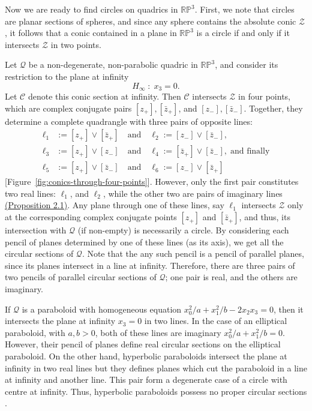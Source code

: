 \documentclass[10pt, a4paper]{article}
\theoremstyle{BoldTopSpacing}
\theoremstyle{BoldTopSpacing}
\theoremstyle{BoldTopSpacing}
\theoremstyle{BoldTopBottomSpacing}
\theoremstyle{BoldTopSpacing}
\theoremstyle{BoldTopBottomSpacing}
\theoremstyle{remark}
\begin{document}
Now we are ready to find circles on quadrics in $\mathbb{R}\mathbb{P}^3$. First, we note that circles are planar sections of spheres, and since any sphere contains the absolute conic $\mathcal{Z}$, it follows that a conic contained in a plane in $\mathbb{R}\mathbb{P}^3$ is a circle if and only if it intersects $\mathcal{Z}$ in two points. \par
Let $\mathcal{Q}$ be a non-degenerate, non-parabolic quadric in $\mathbb{R}\mathbb{P}^3$, and consider its restriction to the plane at infinity
\[
    H_{\infty} \; : \; x_{3} = 0.
\]
Let $\mathcal{C}$ denote this conic section at infinity. Then $\mathcal{C}$ intersects $\mathcal{Z}$ in four points, which are complex conjugate pairs $[z_{+}], [\bar{z}_{+}]$, and $[z_{-}], [\bar{z}_{-}]$. Together, they determine a complete quadrangle with three pairs of opposite lines:
\begin{align*}
    \ell_{1} &:= [z_{+}] \vee [\bar{z}_{+}] \quad \text{and} \quad \ell_{2} := [z_{-}] \vee [\bar{z}_{-}], \\
    \ell_{3} &:= [z_{+}] \vee [z_{-}] \quad \text{and} \quad \ell_{4} := [\bar{z}_{+}] \vee [\bar{z}_{-}], \; \text{and finally} \\
    \ell_{5} &:= [z_{+}] \vee [\bar{z}_{-}] \quad \text{and} \quad \ell_{6} :=  [z_{-}] \vee [\bar{z}_{+}]
\end{align*}
[Figure~\ref{fig:conics-through-four-points}]. However, only the first pair constitutes two real lines: $\ell_{1}$, and $\ell_{2}$, while the other two are pairs of imaginary lines \hyperref[thm:span-real-line]{(Proposition 2.1)}. Any plane through one of these lines, say $\ell_{1}$ intersects $\mathcal{Z}$ only at the corresponding complex conjugate points $[z_{+}]$ and $[\bar{z}_{+}]$, and thus, its intersection with $\mathcal{Q}$ (if non-empty) is necessarily a circle. By considering each pencil of planes determined by one of these lines (as its axis), we get all the circular sections of $\mathcal{Q}$. Note that the any such pencil is a pencil of parallel planes, since its planes intersect in a line at infinity. Therefore, there are three pairs of two pencils of parallel circular sections of $\mathcal{Q}$; one pair is real, and the others are imaginary. \par
If $\mathcal{Q}$ is a paraboloid with homogeneous equation $x_{0}^2 / a + x_{1}^2 / b - 2x_{2}x_{3} = 0$, then it intersects the plane at infinity $x_{3} = 0$ in two lines. In the case of an elliptical paraboloid, with $a, b > 0$, both of these lines are imaginary $x_{0}^2 / a + x_{1}^2 / b = 0$. However, their pencil of planes define real circular sections on the elliptical paraboloid. On the other hand, hyperbolic paraboloids intersect the plane at infinity in two real lines but they defines planes which cut the paraboloid in a line at infinity and another line. This pair form a degenerate case of a circle with centre at infinity. Thus, hyperbolic paraboloids possess no proper circular sections \cite[\textcolor{CitationColor}{p.~204}]{sommervilleAnalyticalGeometry}. \par
\end{document}
